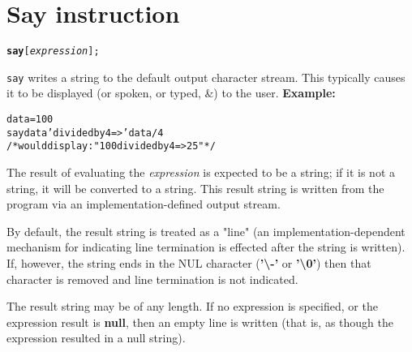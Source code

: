 \chapter{Say instruction}\label{refsay}
\index{,}
\index{,}
\begin{shaded}
\begin{alltt}
\textbf{say} [\emph{expression}];
\end{alltt}
\end{shaded}
 \texttt{say} writes a string to the default output character
stream.
This typically causes it to be displayed (or spoken, or typed, \&) to
the user.
 \textbf{Example:}
\begin{alltt}
data=100
say data 'divided by 4 =>' data/4
/* would display:  "100 divided by 4 => 25"  */
\end{alltt}
 
The result of evaluating the \emph{expression} is expected to be a
string; if it is not a string, it will be converted to a string.
This result string is written from the program via an
implementation-defined output stream.
 
By default, the result string is treated as a "line" (an
implementation-dependent mechanism for indicating line termination is
effected after the string is written).
If, however, the string ends in the NUL character
(\textbf{'\textbackslash -'} or \textbf{'\textbackslash 0'}) then that character
is removed and line termination is not indicated.
 
The result string may be of any length.  If no expression is specified,
or the expression result is \textbf{null}, then an empty line is
written (that is, as though the expression resulted in a null string).
